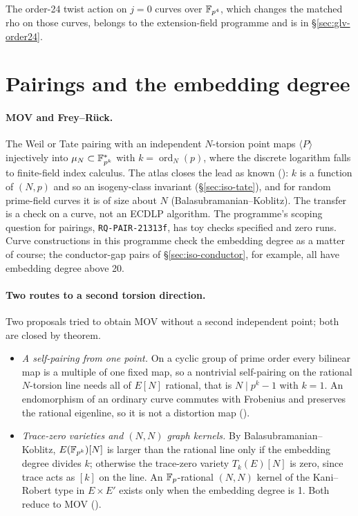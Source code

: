 The order-24 twist action on $j=0$ curves over $\mathbb{F}_{p^4}$, which changes
the matched rho on those curves, belongs to the extension-field programme
and is in \S\ref{sec:glv-order24}.

\section{Pairings and the embedding degree}\label{sec:tp-pairing}

\paragraph{MOV and Frey--R\"uck.} The Weil or Tate pairing with an
independent $N$-torsion point maps $\langle P\rangle$ injectively into
$\mu_N\subset\mathbb{F}_{p^k}^*$ with $k=\operatorname{ord}_N(p)$, where the
discrete logarithm falls to finite-field index calculus. The atlas closes
the lead as known ():
$k$ is a function of $(N,p)$ and so an isogeny-class invariant
(\S\ref{sec:iso-tate}), and for random prime-field curves it is of size
about $N$ (Balasubramanian--Koblitz). The transfer is a check on a curve,
not an ECDLP algorithm. The programme's scoping question for pairings,
\texttt{RQ-PAIR-21313f}, has toy checks specified and zero runs. Curve
constructions in this programme check the embedding degree as a matter of
course; the conductor-gap pairs of \S\ref{sec:iso-conductor}, for example,
all have embedding degree above 20.

\paragraph{Two routes to a second torsion direction.} Two proposals
tried to obtain MOV without a second independent point; both are closed by
theorem.
\begin{itemize}
\item \emph{A self-pairing from one point.} On a cyclic group of prime order
  every bilinear map is a multiple of one fixed map, so a nontrivial
  self-pairing on the rational $N$-torsion line needs all of $E[N]$
  rational, that is $N\mid p^k-1$ with $k=1$. An endomorphism of an
  ordinary curve commutes with Frobenius and preserves the rational
  eigenline, so it is not a distortion map
  ().
\item \emph{Trace-zero varieties and $(N,N)$ graph kernels.} By
  Balasubramanian--Koblitz, $E(\mathbb{F}_{p^k})[N]$ is larger than the rational
  line only if the embedding degree divides $k$; otherwise the trace-zero
  variety $T_k(E)[N]$ is zero, since trace acts as $[k]$ on the line. An
  $\mathbb{F}_p$-rational $(N,N)$ kernel of the Kani--Robert type in $E\times E'$
  exists only when the embedding degree is 1. Both reduce to MOV
  ().
\end{itemize}

